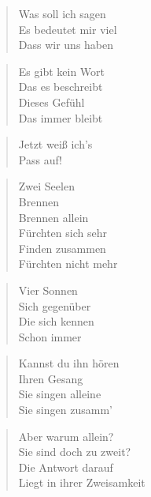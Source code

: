 \documentclass[twocolumn]{article}
\title{\vspace{-3cm}\titlevar}
\author{\authorvar}
\date{\datevar}
\begin{document}
	\maketitle
	
	\begin{verse}
		Was soll ich sagen \\
		Es bedeutet mir viel \\
		Dass wir uns haben \\
	\end{verse}
	
	\begin{verse}	
		Es gibt kein Wort \\
		Das es beschreibt \\
		Dieses Gefühl \\
		Das immer bleibt \\
	\end{verse}
	
	\begin{verse}	
		Jetzt weiß ich's \\
		Pass auf! \\
	\end{verse}
	
	\begin{verse}	
		Zwei Seelen \\
		Brennen \\
		Brennen allein \\
		Fürchten sich sehr \\
		Finden zusammen \\
		Fürchten nicht mehr \\
	\end{verse}
	
	\begin{verse}	
		Vier Sonnen \\
		Sich gegenüber \\
		Die sich kennen \\
		Schon immer \\
	\end{verse}
	
	\begin{verse}	
		Kannst du ihn hören \\
		Ihren Gesang \\
		Sie singen alleine \\
		Sie singen zusamm' \\
	\end{verse}
	
	\begin{verse}	
		Aber warum allein? \\
		Sie sind doch zu zweit? \\
		Die Antwort darauf \\
		Liegt in ihrer Zweisamkeit \\
	\end{verse}
	
\end{document}
